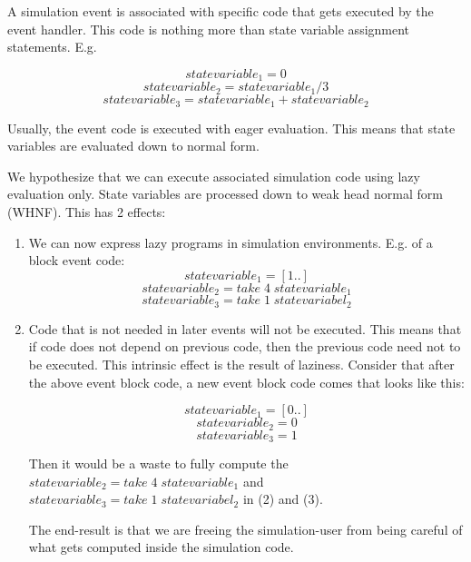 \documentclass[a4paper]{article}
\begin{document}
A simulation event is associated with specific code that gets executed by the event handler.
This code is nothing more than state variable assignment statements.
E.g.

$$statevariable_1 = 0$$
$$statevariable_2 = statevariable_1 / 3$$
$$statevariable_3 = statevariable_1 + statevariable_2$$

Usually, the event code is executed with eager evaluation. This means
that state variables are evaluated down to normal form.

We hypothesize that we can execute associated simulation code using lazy evaluation only.
State variables are processed down to weak head normal form (WHNF).
This has 2 effects:

\begin{enumerate}
\item We can now express lazy programs in simulation environments. E.g. of a block event code:
\begin{equation}statevariable_1 = [1..]\end{equation}
\begin{equation}statevariable_2 = take \; 4 \; statevariable_1\end{equation}
\begin{equation}statevariable_3 = take \; 1 \; statevariabel_2\end{equation}

\item Code that is not needed in later events will not be executed. This means
that if code does not depend on previous code, then the previous code need not
to be executed. This intrinsic effect is the result of laziness. Consider
that after the above event block code, a new event block code comes that looks like this:

\begin{equation}statevariable_1 = [0..]\end{equation}
\begin{equation}statevariable_2 = 0\end{equation}
\begin{equation}statevariable_3 = 1\end{equation}

Then it would be a waste to fully compute the 
$statevariable_2 = take \; 4 \; statevariable_1$
and
$statevariable_3 = take \; 1 \; statevariabel_2$
in (2) and (3).

The end-result is that we are freeing the simulation-user from
being careful of what gets computed inside the simulation code.

\end{enumerate}
\end{document}
